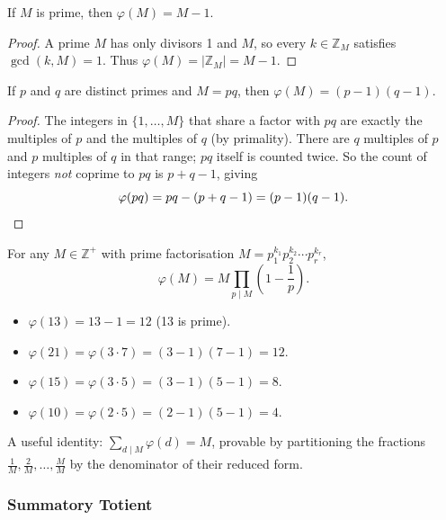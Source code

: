 \begin{theorem}
If $M$ is prime, then $\varphi(M) = M - 1$.
\end{theorem}
\begin{proof}
A prime $M$ has only divisors 1 and $M$, so every $k \in \mathbb{Z}_M$ satisfies $\gcd(k,M)=1$. Thus $\varphi(M) = |\mathbb{Z}_M| = M-1$.
\end{proof}

\begin{theorem}
If $p$ and $q$ are distinct primes and $M = pq$, then $\varphi(M) = (p-1)(q-1)$.
\end{theorem}
\begin{proof}
The integers in $\{1,\ldots,M\}$ that share a factor with $pq$ are exactly the multiples of $p$ and the multiples of $q$ (by primality). There are $q$ multiples of $p$ and $p$ multiples of $q$ in that range; $pq$ itself is counted twice. So the count of integers \emph{not} coprime to $pq$ is $p + q - 1$, giving
\[
\varphi(pq) = pq - (p+q-1) = (p-1)(q-1). \qedhere
\]
\end{proof}

\begin{theorem}
For any $M \in \mathbb{Z}^+$ with prime factorisation $M = p_1^{k_1} p_2^{k_2} \cdots p_r^{k_r}$,
\[
\varphi(M) = M \prod_{p \mid M} \left(1 - \frac{1}{p}\right).
\]
\end{theorem}

\begin{example}
\begin{itemize}
    \item $\varphi(13) = 13 - 1 = 12$ \quad (13 is prime).
    \item $\varphi(21) = \varphi(3 \cdot 7) = (3-1)(7-1) = 12$.
    \item $\varphi(15) = \varphi(3 \cdot 5) = (3-1)(5-1) = 8$.
    \item $\varphi(10) = \varphi(2 \cdot 5) = (2-1)(5-1) = 4$.
\end{itemize}
\end{example}

\begin{remark}
A useful identity: $\displaystyle\sum_{d \mid M} \varphi(d) = M$, provable by partitioning the fractions $\tfrac{1}{M}, \tfrac{2}{M}, \ldots, \tfrac{M}{M}$ by the denominator of their reduced form.
\end{remark}

\subsubsection*{Summatory Totient}

